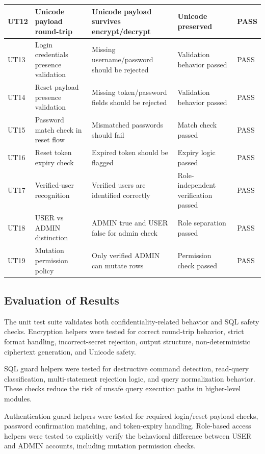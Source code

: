 \begin{table}[H]
\begin{tabular}{|p{}|p{}|p{}|p{}|p{}|}
        \hline
        UT12 & Unicode payload round-trip & Unicode payload survives encrypt/decrypt & Unicode preserved & PASS \\
        \hline
        UT13 & Login credentials presence validation & Missing username/password should be rejected & Validation behavior passed & PASS \\
        \hline
        UT14 & Reset payload presence validation & Missing token/password fields should be rejected & Validation behavior passed & PASS \\
        \hline
        UT15 & Password match check in reset flow & Mismatched passwords should fail & Match check passed & PASS \\
        \hline
        UT16 & Reset token expiry check & Expired token should be flagged & Expiry logic passed & PASS \\
        \hline
        UT17 & Verified-user recognition & Verified users are identified correctly & Role-independent verification passed & PASS \\
        \hline
        UT18 & USER vs ADMIN distinction & ADMIN true and USER false for admin check & Role separation passed & PASS \\
        \hline
        UT19 & Mutation permission policy & Only verified ADMIN can mutate rows & Permission check passed & PASS \\
        \hline
    \end{tabular}
\end{table}

\subsection{Evaluation of Results}

The unit test suite validates both confidentiality-related behavior and SQL safety checks. Encryption helpers were tested for correct round-trip behavior, strict format handling, incorrect-secret rejection, output structure, non-deterministic ciphertext generation, and Unicode safety.

SQL guard helpers were tested for destructive command detection, read-query classification, multi-statement rejection logic, and query normalization behavior. These checks reduce the risk of unsafe query execution paths in higher-level modules.

Authentication guard helpers were tested for required login/reset payload checks, password confirmation matching, and token-expiry handling. Role-based access helpers were tested to explicitly verify the behavioral difference between USER and ADMIN accounts, including mutation permission checks.

